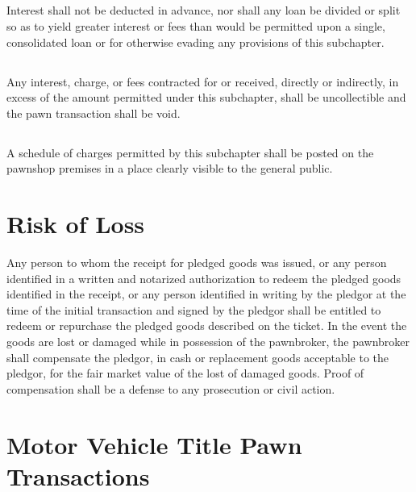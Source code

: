 \subsection{}
Interest shall not be deducted in advance, nor shall any loan be divided or split so as to yield greater interest or fees than would be permitted upon a single, consolidated loan or for otherwise evading any provisions of this subchapter.
\subsection{}
Any interest, charge, or fees contracted for or received, directly or indirectly, in excess of the amount permitted under this subchapter, shall be uncollectible and the pawn transaction shall be void.
\subsection{}
A schedule of charges permitted by this subchapter shall be posted on the pawnshop premises in a place clearly visible to the general public.

\section{Risk of Loss}
Any person to whom the receipt for pledged goods was issued, or any person identified in a written and notarized authorization to redeem the pledged goods identified in the receipt, or any person identified in writing by the pledgor at the time of the initial transaction and signed by the pledgor shall be entitled to redeem or repurchase the pledged goods described on the ticket.  In the event the goods are lost or damaged while in possession of the pawnbroker, the pawnbroker shall compensate the pledgor, in cash or replacement goods acceptable to the pledgor, for the fair market value of the lost of damaged goods.  Proof of compensation shall be a defense to any prosecution or civil action.

\section{Motor Vehicle Title Pawn Transactions}
